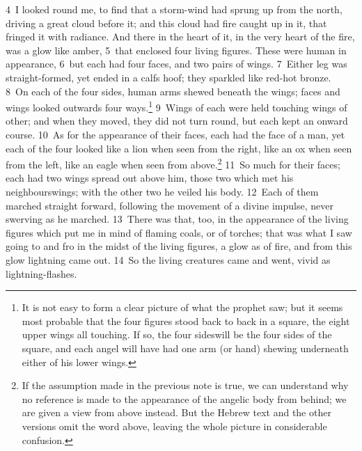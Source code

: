 \documentclass[10pt]{book} %
\begin{document}
\textcolor{benred8}{4}~I looked round me, to find that a storm-wind had sprung up from the north, driving a great cloud before it; and this cloud had fire caught up in it, that fringed it with radiance. And there in the heart of it, in the very heart of the fire, was a glow like amber, \textcolor{benred8}{5}~that enclosed four living figures. These were human in appearance, \textcolor{benred8}{6}~but each had four faces, and two pairs of wings. \textcolor{benred8}{7}~Either leg was straight-formed, yet ended in a calf\textquotesingle s hoof; they sparkled like red-hot bronze. \textcolor{benred8}{8}~On each of the four sides, human arms shewed beneath the wings; faces and wings looked outwards four ways.\footnote[2]{It is not easy to form a clear picture of what the prophet saw; but it seems most probable that the four figures stood back to back in a square, the eight upper wings all touching. If so, the \textasciigrave four sides\textquotesingle  will be the four sides of the square, and each angel will have had one arm (or hand) shewing underneath either of his lower wings.} \textcolor{benred8}{9}~Wings of each were held touching wings of other; and when they moved, they did not turn round, but each kept an onward course. \textcolor{benred8}{10}~As for the appearance of their faces, each had the face of a man, yet each of the four looked like a lion when seen from the right, like an ox when seen from the left, like an eagle when seen from above.\footnote[3]{If the assumption made in the previous note is true, we can understand why no reference is made to the appearance of the angelic body from behind; we are given a view from above instead. But the Hebrew text and the other versions omit the word \textasciigrave above\textquotesingle , leaving the whole picture in considerable confusion.} \textcolor{benred8}{11}~So much for their faces; each had two wings spread out above him, those two which met his neighbours\textquotesingle  wings; with the other two he veiled his body. \textcolor{benred8}{12}~Each of them marched straight forward, following the movement of a divine impulse, never swerving as he marched. \textcolor{benred8}{13}~There was that, too, in the appearance of the living figures which put me in mind of flaming coals, or of torches; that was what I saw going to and fro in the midst of the living figures, a glow as of fire, and from this glow lightning came out. \textcolor{benred8}{14}~So the living creatures came and went, vivid as lightning-flashes.
\end{document}
